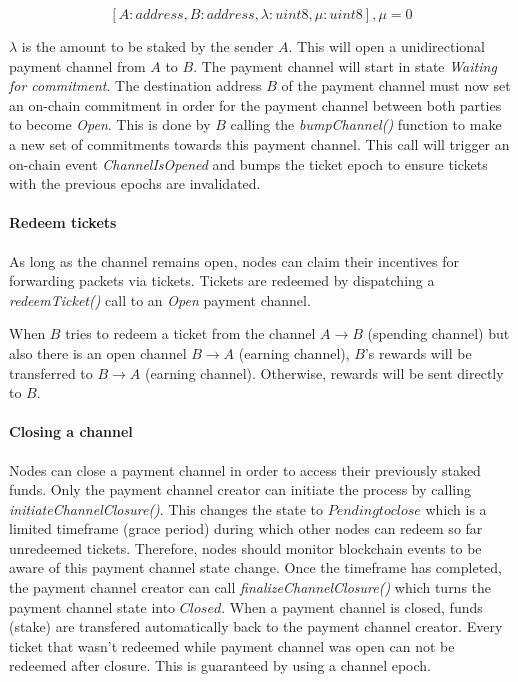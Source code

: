$$[A: address, B: address, \lambda: uint8, \mu: uint8], \mu = 0$$

$\lambda$ is the amount to be staked by the sender $A$. This will open a
unidirectional payment channel from $A$ to $B$. The payment channel will start
in state \textit{Waiting for commitment}. The destination address $B$ of the
payment channel must now set an on-chain commitment in order for the payment
channel between both parties to become \textit{Open}. This is done by $B$
calling the \textit{bumpChannel()} function to make a new set of commitments
towards this payment channel. This call will trigger an on-chain event
\textit{ChannelIsOpened} and bumps the ticket epoch to ensure tickets with the
previous epochs are invalidated.

\paragraph{Redeem tickets}
As long as the channel remains open, nodes can claim their incentives for
forwarding packets via tickets. Tickets are redeemed by dispatching a
\textit{redeemTicket()} call to an \textit{Open} payment channel.

When $B$ tries to redeem a ticket from the channel $A\rightarrow B$ (spending
channel) but also there is an open channel $B\rightarrow A$ (earning channel),
$B$'s rewards will be transferred to $B\rightarrow A$ (earning channel).
Otherwise, rewards will be sent directly to $B$.

\paragraph{Closing a channel}
Nodes can close a payment channel in order to access their previously staked
funds. Only the payment channel creator can initiate the process by calling
\textit{initiateChannelClosure()}. This changes the state to $Pending to close$
which is a limited timeframe (grace period) during which other nodes can redeem
so far unredeemed tickets. Therefore, nodes should monitor blockchain events to
be aware of this payment channel state change.
Once the timeframe has completed, the payment channel creator can call
\textit{finalizeChannelClosure()} which turns the payment channel state into
$Closed$. When a payment channel is closed, funds (stake) are transfered
automatically back to the payment channel creator. Every ticket that wasn't
redeemed while payment channel was open can not be redeemed after closure. This
is guaranteed by using a channel epoch.

